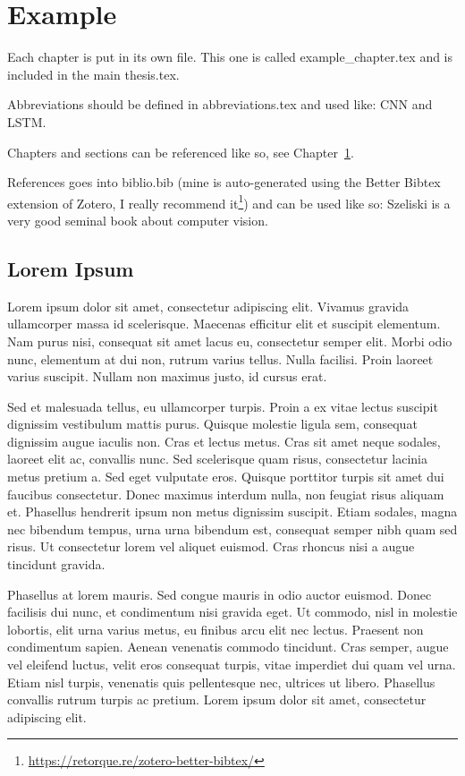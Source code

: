 \chapter{Example}
\label{chap:example}

Each chapter is put in its own file. This one is called example\_chapter.tex and is included in the main thesis.tex.

Abbreviations should be defined in abbreviations.tex and used like: \gls{CNN} and \gls{LSTM}.

Chapters and sections can be referenced like so, see Chapter~\ref{chap:example}.

References goes into biblio.bib (mine is auto-generated using the Better Bibtex extension of Zotero, I really recommend it\footnote{\url{https://retorque.re/zotero-better-bibtex/}}) and can be used like so: Szeliski \etal \cite{SzeliskiComputerVisionAlgorithms2011} is a very good seminal book about computer vision.

\section{Lorem Ipsum}
\label{sec:lorem_ipsum}

Lorem ipsum dolor sit amet, consectetur adipiscing elit. Vivamus gravida ullamcorper massa id scelerisque. Maecenas efficitur elit et suscipit elementum. Nam purus nisi, consequat sit amet lacus eu, consectetur semper elit. Morbi odio nunc, elementum at dui non, rutrum varius tellus. Nulla facilisi. Proin laoreet varius suscipit. Nullam non maximus justo, id cursus erat.

Sed et malesuada tellus, eu ullamcorper turpis. Proin a ex vitae lectus suscipit dignissim vestibulum mattis purus. Quisque molestie ligula sem, consequat dignissim augue iaculis non. Cras et lectus metus. Cras sit amet neque sodales, laoreet elit ac, convallis nunc. Sed scelerisque quam risus, consectetur lacinia metus pretium a. Sed eget vulputate eros. Quisque porttitor turpis sit amet dui faucibus consectetur. Donec maximus interdum nulla, non feugiat risus aliquam et. Phasellus hendrerit ipsum non metus dignissim suscipit. Etiam sodales, magna nec bibendum tempus, urna urna bibendum est, consequat semper nibh quam sed risus. Ut consectetur lorem vel aliquet euismod. Cras rhoncus nisi a augue tincidunt gravida.

Phasellus at lorem mauris. Sed congue mauris in odio auctor euismod. Donec facilisis dui nunc, et condimentum nisi gravida eget. Ut commodo, nisl in molestie lobortis, elit urna varius metus, eu finibus arcu elit nec lectus. Praesent non condimentum sapien. Aenean venenatis commodo tincidunt. Cras semper, augue vel eleifend luctus, velit eros consequat turpis, vitae imperdiet dui quam vel urna. Etiam nisl turpis, venenatis quis pellentesque nec, ultrices ut libero. Phasellus convallis rutrum turpis ac pretium. Lorem ipsum dolor sit amet, consectetur adipiscing elit.

